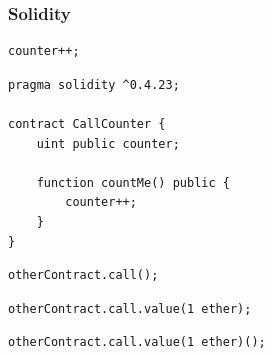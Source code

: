 \documentclass[xcolor=x11names,compress]{beamer}
\begin{document}
\begin{frame}
\begin{overprint}
\begin{center}
		\end{center}
	\end{overprint}
\end{frame}

\bgroup
\begin{frame}[fragile]
	\frametitle{Solidity}
	\begin{overprint}
		\begin{minipage}[c][0.7\textheight][c]{\textwidth}
			\begin{verbatim}
counter++;
\end{verbatim}
		\end{minipage}
		\begin{minipage}[c][0.7\textheight][c]{\textwidth}
			\begin{verbatim}
pragma solidity ^0.4.23;

contract CallCounter {
    uint public counter;

    function countMe() public {
        counter++;
    }
}
\end{verbatim}
		\end{minipage}
		\begin{minipage}[c][0.7\textheight][c]{\textwidth}
			\begin{verbatim}
otherContract.call();
\end{verbatim}
		\end{minipage}
		\begin{minipage}[c][0.7\textheight][c]{\textwidth}
			\begin{verbatim}
otherContract.call.value(1 ether);
\end{verbatim}
		\end{minipage}
		\begin{minipage}[c][0.7\textheight][c]{\textwidth}
			\begin{verbatim}
otherContract.call.value(1 ether)();
\end{verbatim}
		\end{minipage}
	\end{overprint}
\end{frame}
\egroup
\end{document}

